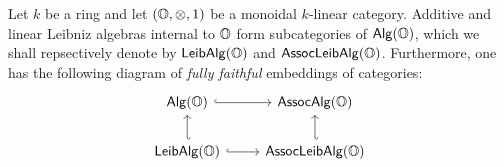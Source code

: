                     \begin{proposition} \label{prop: leibniz_algebra_categories}
                        Let $k$ be a ring and let $(\O, \tensor, 1)$ be a monoidal $k$-linear category. Additive and linear Leibniz algebras internal to $\mathbb{O}$ form subcategories of $\mathsf{Alg}(\mathbb{O})$, which we shall repsectively denote by $\mathsf{Leib}\mathsf{Alg}(\mathbb{O})$ and $\mathsf{Assoc}\mathsf{Leib}\mathsf{Alg}(\mathbb{O})$. Furthermore, one has the following diagram of \textit{fully faithful} embeddings of categories:
                            $$
                                \begin{tikzcd}
                                	{\Alg(\O)} & {\Assoc\Alg(\O)} \\
                                	{\Leib\Alg(\O)} & {\Assoc\Leib\Alg(\O)}
                                	\arrow[hook', from=2-1, to=1-1]
                                	\arrow[hook', from=2-2, to=1-2]
                                	\arrow[hook, from=2-1, to=2-2]
                                	\arrow[hook, from=1-1, to=1-2]
                                \end{tikzcd}
                            $$
                    \end{proposition}
